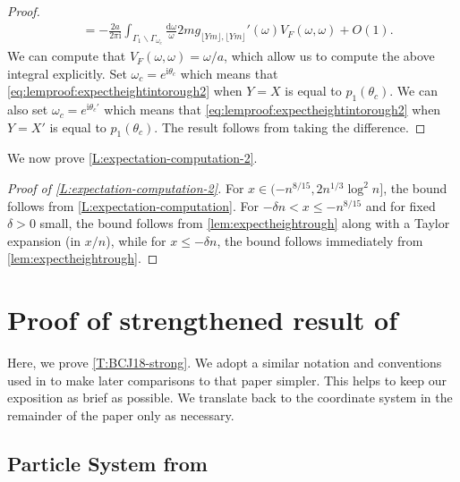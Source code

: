 \documentclass[11pt,twoside]{amsart}
\theoremstyle{plain}
\numberwithin{quest}{section}
\theoremstyle{remark}
\numberwithin{rem}{section}
\theoremstyle{definition}
\begin{document}
{\begin{proof}
\begin{equation*}
\begin{split}
					&=-\frac{2a}{2\pi \mathrm{i}} \int_{\Gamma_1 \backslash \Gamma_{\omega_c}}\frac{\mathrm{d}  \omega}{\omega} 2m g_{ \lfloor Ym \rfloor, \lfloor Ym \rfloor}'(\omega) V_F(\omega,\omega)+O(1).
				\end{split}
			\end{equation*}
			We can compute that $V_F(\omega,\omega)=\omega/a$, which allow us to compute the above integral  explicitly. Set $\omega_c=e^{\mathrm{i}\theta_c}$ which means that \eqref{eq:lemproof:expectheightintorough2} when $Y=X$ is equal to $p_1(\theta_c)$. We can also set $\omega_c=e^{\mathrm{i}\theta_c'}$ which means that \eqref{eq:lemproof:expectheightintorough2} when $Y=X'$ is equal to $p_1(\theta_c)$. The result follows from taking the difference.	\end{proof}
		
		
	}
	
	
	We now prove \cref{L:expectation-computation-2}.  
	
	\begin{proof}[Proof of \cref{L:expectation-computation-2}]
		For $x \in (-n^{8/15},2n^{1/3}\log^2n]$, the bound follows from \cref{L:expectation-computation}. For $-\delta n < x \leq -n^{8/15}$ and for fixed $\delta>0$ small, the bound follows from \cref{lem:expectheightrough} along with a Taylor expansion (in $x/n$), while for $x \leq -\delta n$, the bound follows immediately from \cref{lem:expectheightrough}. 
	\end{proof}
	
	
	
	
	
	
	
	
	
	
	\section{Proof of strengthened result of \cite{BCJ18}}
\label{S:BCJ18}
Here, we prove \cref{T:BCJ18-strong}.   We adopt a similar notation and conventions used in \cite{BCJ18} to make later comparisons to that paper simpler. This helps to keep our exposition as brief as possible. We translate back to the coordinate system in the remainder of the paper only as necessary. 

\subsection{Particle System from \cite{BCJ18}}
\end{document}

